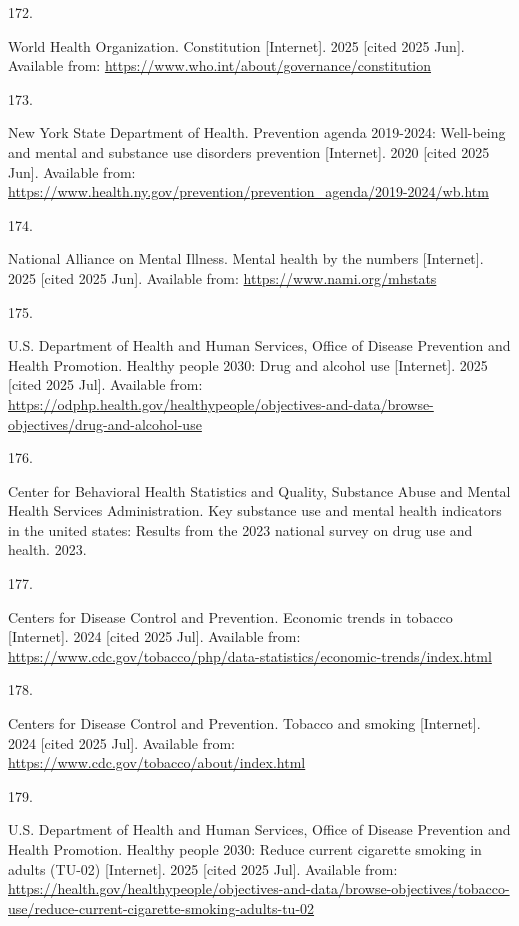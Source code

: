 \documentclass[
  english,
  letterpaper,
]{report}
\newlength{\cslhangindent}
\newlength{\csllabelwidth}
\newenvironment{CSLReferences}[2] %
 {\begin{list}{}{%
  \setlength{\itemindent}{0pt}
  \setlength{\leftmargin}{0pt}
  \setlength{\parsep}{0pt}
  \ifodd #1
   \setlength{\leftmargin}{\cslhangindent}
   \setlength{\itemindent}{-1\cslhangindent}
  \fi
  \setlength{\itemsep}{#2\baselineskip}}}
 {\end{list}}
\newcommand{\CSLLeftMargin}[1]{\parbox[t]{\csllabelwidth}{\strut#1\strut}}
\newcommand{\CSLRightInline}[1]{\parbox[t]{\linewidth - \csllabelwidth}{\strut#1\strut}}
\begin{document}
\begin{CSLReferences}{0}{1}
\CSLLeftMargin{172. }%
\CSLRightInline{World Health Organization. Constitution {[}Internet{]}.
2025 {[}cited 2025 Jun{]}. Available from:
\url{https://www.who.int/about/governance/constitution}}

\CSLLeftMargin{173. }%
\CSLRightInline{New York State Department of Health. Prevention agenda
2019-2024: Well-being and mental and substance use disorders prevention
{[}Internet{]}. 2020 {[}cited 2025 Jun{]}. Available from:
\url{https://www.health.ny.gov/prevention/prevention_agenda/2019-2024/wb.htm}}

\CSLLeftMargin{174. }%
\CSLRightInline{National Alliance on Mental Illness. Mental health by
the numbers {[}Internet{]}. 2025 {[}cited 2025 Jun{]}. Available from:
\url{https://www.nami.org/mhstats}}

\CSLLeftMargin{175. }%
\CSLRightInline{U.S. Department of Health and Human Services, Office of
Disease Prevention and Health Promotion. Healthy people 2030: Drug and
alcohol use {[}Internet{]}. 2025 {[}cited 2025 Jul{]}. Available from:
\url{https://odphp.health.gov/healthypeople/objectives-and-data/browse-objectives/drug-and-alcohol-use}}

\CSLLeftMargin{176. }%
\CSLRightInline{Center for Behavioral Health Statistics and Quality,
Substance Abuse and Mental Health Services Administration. Key substance
use and mental health indicators in the united states: Results from the
2023 national survey on drug use and health. 2023.}

\CSLLeftMargin{177. }%
\CSLRightInline{Centers for Disease Control and Prevention. Economic
trends in tobacco {[}Internet{]}. 2024 {[}cited 2025 Jul{]}. Available
from:
\url{https://www.cdc.gov/tobacco/php/data-statistics/economic-trends/index.html}}

\CSLLeftMargin{178. }%
\CSLRightInline{Centers for Disease Control and Prevention. Tobacco and
smoking {[}Internet{]}. 2024 {[}cited 2025 Jul{]}. Available from:
\url{https://www.cdc.gov/tobacco/about/index.html}}

\CSLLeftMargin{179. }%
\CSLRightInline{U.S. Department of Health and Human Services, Office of
Disease Prevention and Health Promotion. Healthy people 2030: Reduce
current cigarette smoking in adults (TU-02) {[}Internet{]}. 2025
{[}cited 2025 Jul{]}. Available from:
\url{https://health.gov/healthypeople/objectives-and-data/browse-objectives/tobacco-use/reduce-current-cigarette-smoking-adults-tu-02}}


\end{CSLReferences}
\end{document}
